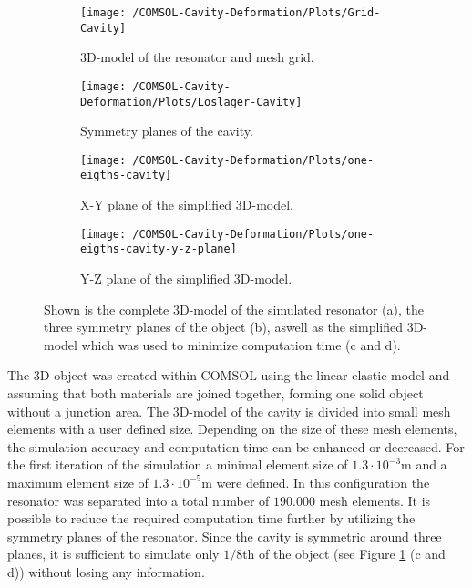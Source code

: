 \begin{figure}[h]
	
	\begin{subfigure}[t]{.45\textwidth}
		\centering
		\texttt{[image: /COMSOL-Cavity-Deformation/Plots/Grid-Cavity]}
		\caption{3D-model of the resonator and mesh grid.\hfill}
	\end{subfigure}
	\hfill
	\begin{subfigure}[t]{.45\textwidth}
		\centering
		\texttt{[image: /COMSOL-Cavity-Deformation/Plots/Loslager-Cavity]}
		\caption{Symmetry planes of the cavity.\hfill}
	\end{subfigure}
	
	\medskip
	\begin{subfigure}[t]{.45\textwidth}
		\centering
		\texttt{[image: /COMSOL-Cavity-Deformation/Plots/one-eigths-cavity]}
		\caption{X-Y plane of the simplified 3D-model.\hfill}
	\end{subfigure}
	\hfill
	\begin{subfigure}[t]{.45\textwidth}
		\centering
		\texttt{[image: /COMSOL-Cavity-Deformation/Plots/one-eigths-cavity-y-z-plane]}
		\caption{Y-Z plane of the simplified 3D-model.\hfill}
	\end{subfigure}
	
	\caption{Shown is the complete 3D-model of the simulated resonator (a), the three symmetry planes of the object (b), aswell as the simplified 3D-model which was used to minimize computation time (c and d).}
	\label{fig:CNAM-cavity-3D}
\end{figure}
\noindent
The 3D object was created within COMSOL using the linear elastic model and assuming that both materials are joined together, forming one solid object without a junction area. The 3D-model of the cavity is divided into small mesh elements with a user defined size. Depending on the size of these mesh elements, the simulation accuracy and computation time can be enhanced or decreased. For the first iteration of the simulation a minimal element size of $1.3 \cdot 10^{-3}$m and a maximum element size of $1.3 \cdot 10^{-5}$m were defined. In this configuration the resonator was separated into a total number of $190.000$ mesh elements. It is possible to reduce the required computation time further by utilizing the symmetry planes of the resonator. Since the cavity is symmetric around three planes, it is sufficient to simulate only $1/8$th of the object (see Figure \ref{fig:CNAM-cavity-3D} (c and d)) without losing any information. 
